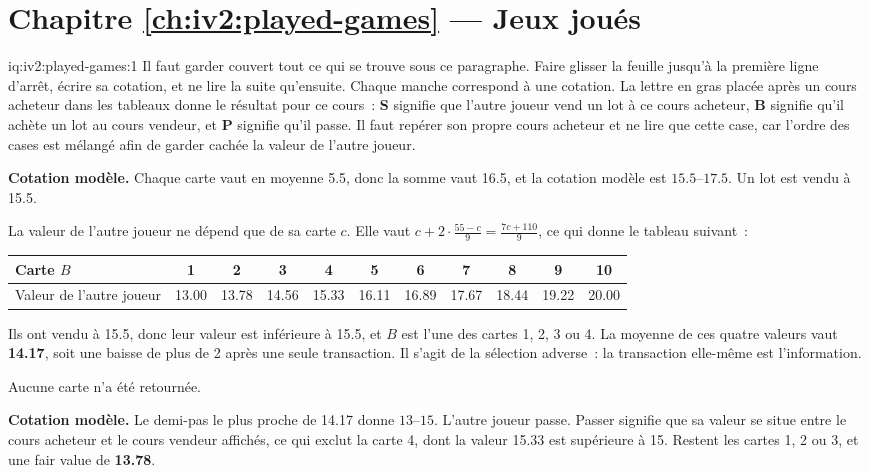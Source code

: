 \section*{Chapitre \ref{ch:iv2:played-games} --- Jeux joués}

\begin{solution}{iq:iv2:played-games:1}
Il faut garder couvert tout ce qui se trouve sous ce paragraphe. Faire glisser la feuille jusqu'à la première ligne d'arrêt, écrire sa cotation, et ne lire la suite qu'ensuite. Chaque manche correspond à une cotation. La lettre en gras placée après un cours acheteur dans les tableaux donne le résultat pour ce cours~: \textbf{S} signifie que l'autre joueur vend un lot à ce cours acheteur, \textbf{B} signifie qu'il achète un lot au cours vendeur, et \textbf{P} signifie qu'il passe. Il faut repérer son propre cours acheteur et ne lire que cette case, car l'ordre des cases est mélangé afin de garder cachée la valeur de l'autre joueur.

\ivstop

\textbf{Cotation modèle.} Chaque carte vaut en moyenne 5.5, donc la somme vaut 16.5, et la cotation modèle est $15.5$--$17.5$. Un lot est vendu à 15.5.

La valeur de l'autre joueur ne dépend que de sa carte $c$. Elle vaut $c + 2 \cdot \frac{55 - c}{9} = \frac{7c + 110}{9}$, ce qui donne le tableau suivant~:
\begin{center}\small
\begin{tabular}{@{}l*{10}{c}@{}}
Carte $B$ & 1 & 2 & 3 & 4 & 5 & 6 & 7 & 8 & 9 & 10 \\ \hline
Valeur de l'autre joueur & 13.00 & 13.78 & 14.56 & 15.33 & 16.11 & 16.89 & 17.67 & 18.44 & 19.22 & 20.00
\end{tabular}
\end{center}
Ils ont vendu à 15.5, donc leur valeur est inférieure à 15.5, et $B$ est l'une des cartes 1, 2, 3 ou 4. La moyenne de ces quatre valeurs vaut \textbf{14.17}, soit une baisse de plus de 2 après une seule transaction. Il s'agit de la sélection adverse~: la transaction elle-même est l'information.

Aucune carte n'a été retournée.
\ivstop

\textbf{Cotation modèle.} Le demi-pas le plus proche de 14.17 donne $13$--$15$. L'autre joueur passe. Passer signifie que sa valeur se situe entre le cours acheteur et le cours vendeur affichés, ce qui exclut la carte 4, dont la valeur 15.33 est supérieure à 15. Restent les cartes 1, 2 ou 3, et une fair value de \textbf{13.78}.


\end{solution}
